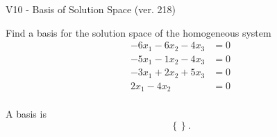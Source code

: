\begin{exercise}
  \begin{exerciseTitle}V10 - Basis of Solution Space (ver. 218)\end{exerciseTitle}
  \begin{exerciseStatement}
    Find a basis for the solution space of the homogeneous system 
\begin{align*}
 -6 x_ 1 -6 x_ 2 -4 x_ 3 &= 0  \\ 
  -5 x_ 1 -1 x_ 2 -4 x_ 3 &= 0  \\ 
  -3 x_ 1 + 2 x_ 2 + 5 x_ 3 &= 0  \\ 
  2 x_ 1 -4 x_ 2 &= 0  \\ 
 \end{align*}


 
  \end{exerciseStatement}

  \begin{exerciseAnswer}
   A basis is   
\[\left\{\right\}.\]

  


  \end{exerciseAnswer}
\end{exercise}
